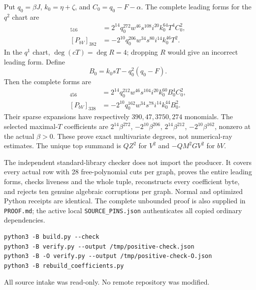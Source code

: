 Put $q_0=\beta J$, $k_0=\eta+\zeta$, and $C_0=q_0-F-\alpha$.
The complete leading forms for the $q^2$ chart are
\begin{align*}
 [P_{V^2}]_{516}&=2^{14}q_0^{272}w^{46}s^{108}i^{20}k_0^{64}T^4C_0^2,\\
 [P_{bV}]_{382}&=-2^{10}q_0^{206}w^{34}s^{80}i^{14}k_0^{46}T^2.
\end{align*}
In the $q^1$ chart, $\deg(cT)=\deg R=4$; dropping $R$ would give an
incorrect leading form. Define
\[
 B_0=k_0sT-q_0^2(q_0-F).
\]
Then the complete forms are
\begin{align*}
 [P_{V^2}]_{456}&=2^{14}q_0^{212}w^{46}s^{104}i^{20}k_0^{60}B_0^4C_0^2,\\
 [P_{bV}]_{338}&=-2^{10}q_0^{162}w^{34}s^{78}i^{14}k_0^{44}B_0^2.
\end{align*}
Their sparse expansions have respectively $390,47,3750,274$ monomials.
The selected maximal-$T$ coefficients are $2^{14}\beta^{272}$,
$-2^{10}\beta^{206}$, $2^{14}\beta^{212}$, $-2^{10}\beta^{162}$, nonzero
at the actual $\beta>0$. These prove exact multivariate degrees, not
numerical-ray estimates. The unique top summand is $QZ^2$ for $V^2$ and
$-QM^2GV^2$ for $bV$.

The independent standard-library checker does not import the producer. It
covers every actual row with 28 free-polynomial cuts per graph, proves the
entire leading forms, checks liveness and the whole tuple, reconstructs every
coefficient byte, and rejects ten genuine algebraic corruptions per graph.
Normal and optimized Python receipts are identical. The complete unbounded
proof is also supplied in \texttt{PROOF.md}; the active local
\texttt{SOURCE\_PINS.json} authenticates all copied ordinary dependencies.
\begin{verbatim}
python3 -B build.py --check
python3 -B verify.py --output /tmp/positive-check.json
python3 -B -O verify.py --output /tmp/positive-check-O.json
python3 -B rebuild_coefficients.py
\end{verbatim}
All source intake was read-only. No remote repository was modified.
